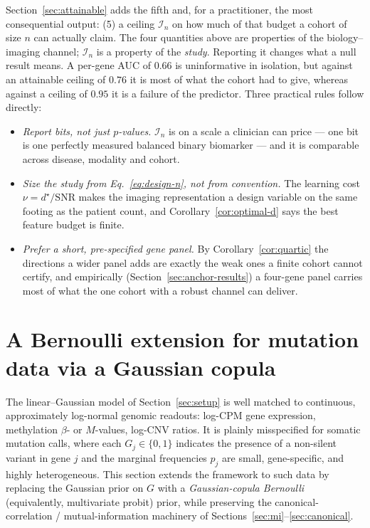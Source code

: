 \documentclass{article}
\begin{document}
Section~\ref{sec:attainable} adds the fifth and, for a practitioner, the most
consequential output: (5) a ceiling $\mathcal{I}_n$ on how much of that budget a
cohort of size $n$ can actually claim. The four quantities above are properties
of the biology--imaging channel; $\mathcal{I}_n$ is a property of the
\emph{study}. Reporting it changes what a null result means. A per-gene AUC of
$0.66$ is uninformative in isolation, but against an attainable ceiling of
$0.76$ it is most of what the cohort had to give, whereas against a
ceiling of $0.95$ it is a failure of the predictor. Three practical rules follow
directly:
\begin{itemize}
\item \emph{Report bits, not just $p$-values.} $\mathcal{I}_n$ is on a scale a
clinician can price --- one bit is one perfectly measured balanced binary
biomarker --- and it is comparable across disease, modality and cohort.
\item \emph{Size the study from Eq.~\eqref{eq:design-n}, not from convention.}
The learning cost $\nu = d^\star/\mathrm{SNR}$ makes the imaging representation
a design variable on the same footing as the patient count, and
Corollary~\ref{cor:optimal-d} says the best feature budget is finite.
\item \emph{Prefer a short, pre-specified gene panel.} By
Corollary~\ref{cor:quartic} the directions a wider panel adds are exactly the
weak ones a finite cohort cannot certify, and empirically
(Section~\ref{sec:anchor-results}) a four-gene panel carries most of what the
one cohort with a robust channel can deliver.
\end{itemize}

\section{A Bernoulli extension for mutation data via a Gaussian copula}
\label{sec:bernoulli}

The linear--Gaussian model of Section~\ref{sec:setup} is well matched to
continuous, approximately log-normal genomic readouts: log-CPM gene expression,
methylation $\beta$- or $M$-values, log-CNV ratios. It is plainly misspecified
for somatic mutation calls, where each $G_j \in \{0,1\}$ indicates the presence
of a non-silent variant in gene $j$ and the marginal frequencies $p_j$ are
small, gene-specific, and highly heterogeneous. This section extends the
framework to such data by replacing the Gaussian prior on $G$ with a
\emph{Gaussian-copula Bernoulli} (equivalently, multivariate probit) prior,
while preserving the canonical-correlation / mutual-information machinery of
Sections~\ref{sec:mi}--\ref{sec:canonical}.
\end{document}
